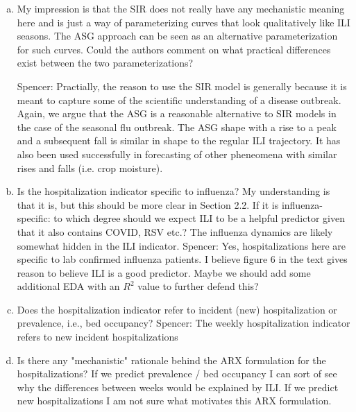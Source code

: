 \documentclass{article}
\newcommand{\spencer}[1]{{\color{green} Spencer: #1}}
\begin{document}
\begin{enumerate}[1.]
\begin{enumerate}[a.]
\spencer{I agree with these comments on the SIR model. Perhaps we emphasized the SIR model more than we 
should have. Osthus et al. use the SIR model in combination with a data driven model
in an attempt to capture some aspect of the science in their forecast model.
More important in the argument of this paper than that the specific SIR model is
a superior in some way for modeling ILI is that the ASG model may
be a reasonable alternative to existing compartmental models at least in terms
of forecast performance.}

\item My impression is that the SIR does not really have any mechanistic meaning here and is just a
way of parameterizing curves that look qualitatively like ILI seasons. The ASG approach can be
seen as an alternative parameterization for such curves. Could the authors comment on what
practical differences exist between the two parameterizations?

\spencer{Practially, the reason to use the SIR model is generally because it is meant
to capture some of the scientific understanding of a disease outbreak. Again, we argue 
that the ASG is a reasonable alternative to SIR models in the case of the seasonal flu
outbreak. The ASG shape with a rise to a peak and a subsequent fall is similar in shape
to the regular ILI trajectory. It has also been used successfully in forecasting of 
other pheneomena with similar rises and falls (i.e. crop moisture)}.



\item Is the hospitalization indicator specific to influenza? My understanding is that it is, but this
should be more clear in Section 2.2. If it is influenza-specific: to which degree should we expect ILI
to be a helpful predictor given that it also contains COVID, RSV etc.? The influenza dynamics are
likely somewhat hidden in the ILI indicator.
\spencer{Yes, hospitalizations here are specific to lab confirmed influenza patients. 
I believe figure 6 in the text gives reason to believe ILI is a good predictor. Maybe 
we should add some additional EDA with an $R^2$ value to further defend this?}


\item Does the hospitalization indicator refer to incident (new) hospitalization or prevalence, i.e.,
bed occupancy?
\spencer{The weekly hospitalization indicator refers to new incident hospitalizations}

\item Is there any "mechanistic" rationale behind the ARX formulation for the hospitalizations? If we
predict prevalence / bed occupancy I can sort of see why the differences between weeks would be
explained by ILI. If we predict new hospitalizations I am not sure what motivates this ARX
formulation.


\end{enumerate}
\end{enumerate}
\end{document}
